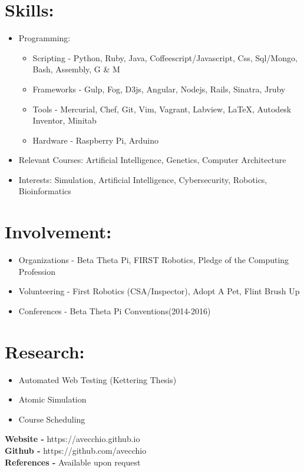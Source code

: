 \documentclass{res}
\begin{document}
\section{Skills:}
\begin{itemize}[leftmargin=*]
\item Programming:
\begin{itemize}[label=$\circ$]
\item Scripting - Python, Ruby, Java, Coffeescript/Javascript, Css, Sql/Mongo, Bash, Assembly, G \& M
\item Frameworks - Gulp, Fog, D3js, Angular, Nodejs, Rails, Sinatra, Jruby
\item Tools - Mercurial, Chef, Git, Vim, Vagrant, Labview, \LaTeX, Autodesk Inventor, Minitab
\item Hardware - Raspberry Pi, Arduino
\end{itemize}
\item Relevant Courses: Artificial Intelligence, Genetics, Computer Architecture
\item Interests: Simulation, Artificial Intelligence, Cybersecurity, Robotics, Bioinformatics
\end{itemize}

\section{Involvement:}
\begin{itemize}[leftmargin=*]
\item Organizations - Beta Theta Pi, FIRST Robotics, Pledge of the Computing Profession
\item Volunteering - First Robotics (CSA/Inspector), Adopt A Pet, Flint Brush Up
\item Conferences - Beta Theta Pi Conventions(2014-2016)%
\end{itemize}

\section{Research:}
\begin{itemize}[leftmargin=*]
\item Automated Web Testing (Kettering Thesis)
\item Atomic Simulation
\item Course Scheduling
\end{itemize}

\begin{center}
\textbf{Website - }https://avecchio.github.io\\
\textbf{Github - }https://github.com/avecchio\\
\textbf{References - }Available upon request
\end{center}
\end{document}
